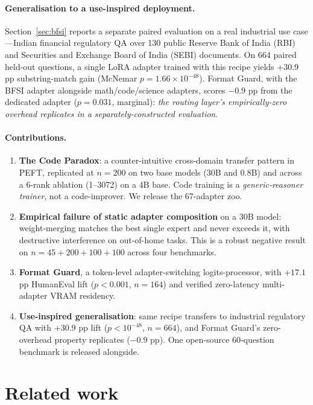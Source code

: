 \documentclass{article}
\begin{document}
\paragraph{Generalisation to a use-inspired deployment.} Section~\ref{sec:bfsi} reports a separate paired evaluation on a real industrial use case---Indian financial regulatory QA over 130 public Reserve Bank of India (RBI) and Securities and Exchange Board of India (SEBI) documents. On 664 paired held-out questions, a single LoRA adapter trained with this recipe yields $+30.9$ pp substring-match gain (McNemar $p = 1.66 \times 10^{-48}$). Format Guard, with the BFSI adapter alongside math/code/science adapters, scores $-0.9$ pp from the dedicated adapter ($p = 0.031$, marginal): \emph{the routing layer's empirically-zero overhead replicates in a separately-constructed evaluation}.

\paragraph{Contributions.}
\begin{enumerate}[leftmargin=*]
  \item \textbf{The Code Paradox}: a counter-intuitive cross-domain transfer pattern in PEFT, replicated at $n=200$ on two base models (30B and 0.8B) and across a 6-rank ablation (1--3072) on a 4B base. Code training is a \emph{generic-reasoner trainer}, not a code-improver. We release the 67-adapter zoo.
  \item \textbf{Empirical failure of static adapter composition} on a 30B model: weight-merging matches the best single expert and never exceeds it, with destructive interference on out-of-home tasks. This is a robust negative result on $n=45 + 200 + 100 + 100$ across four benchmarks.
  \item \textbf{Format Guard}, a token-level adapter-switching logits-processor, with $+17.1$ pp HumanEval lift ($p < 0.001$, $n=164$) and verified zero-latency multi-adapter VRAM residency.
  \item \textbf{Use-inspired generalisation}: same recipe transfers to industrial regulatory QA with $+30.9$ pp lift ($p < 10^{-48}$, $n=664$), and Format Guard's zero-overhead property replicates ($-0.9$ pp). One open-source 60-question benchmark is released alongside.
\end{enumerate}


\section{Related work}
\label{sec:related}
\end{document}
